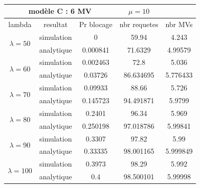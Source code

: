\vspace{1cm} \quad \\
\begin{tabular}{|c|c|c|c|c|}
\hline
\multicolumn{3}{|c}{modèle C : 6 MV} &\multicolumn{1}{c}{$\mu=10$}&\\
\hline 
\multicolumn{1}{|c|}{lambda}& \multicolumn{1}{c|}{resultat} & \multicolumn{1}{c|}{Pr blocage} & \multicolumn{1}{c|}{nbr requetes} & \multicolumn{1}{c|}{nbr MVs}  \\
\hline
 \multirow{2}{*}{$\lambda = 50$}  & simulation & 0 & 59.94 & 4.243 \\ \cline{2-5}
                            & analytique & 0.000841 & 71.6329 & 4.99579 \\ \hline
                            
  \multirow{2}{*}{$\lambda = 60$} & simulation & 0.002463 & 72.8 & 5.036 \\ \cline{2-5}
                            & analytique & 0.03726 & 86.634695 & 5.776433 \\ \hline
  \multirow{2}{*}{$\lambda = 70$}  & simulation & 0.09933 & 88.66 & 5.726 \\ \cline{2-5}
                            & analytique & 0.145723 & 94.491871 & 5.9799 \\ \hline
  \multirow{2}{*}{$\lambda = 80$}  & simulation & 0.2401 & 96.34 & 5.969 \\ \cline{2-5}
                            & analytique & 0.250198 & 97.018786 & 5.99841 \\ \hline
  \multirow{2}{*}{$\lambda = 90$}& simulation & 0.3307 & 97.82 & 5.99 \\ \cline{2-5}
                            & analytique & 0.33335 & 98.001165 & 5.999849 \\ \hline
  \multirow{2}{*}{$\lambda = 100$} & simulation & 0.3973 & 98.29 & 5.992 \\ \cline{2-5}
                            & analytique & 0.4 & 98.500101 & 5.99998 \\ \hline
\end{tabular}  
\vspace{1cm}  \quad \\
